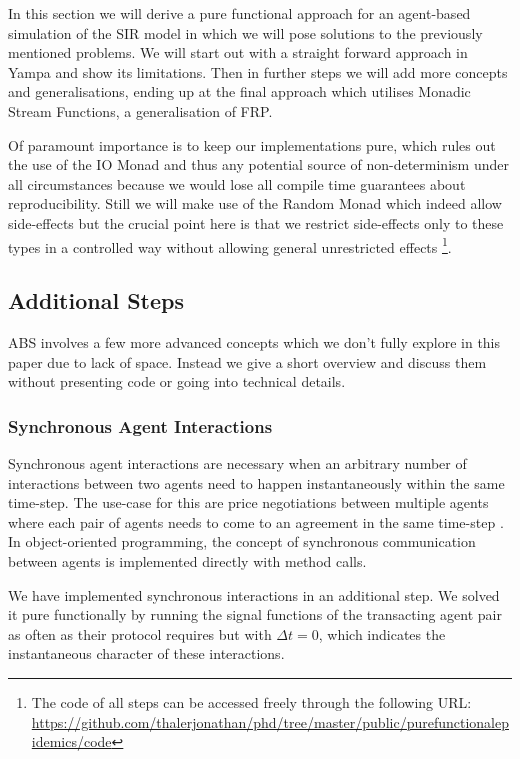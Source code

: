 In this section we will derive a pure functional approach for an agent-based simulation of the SIR model in which we will pose solutions to the previously mentioned problems. We will start out with a straight forward approach in Yampa and show its limitations. Then in further steps we will add more concepts and generalisations, ending up at the final approach which utilises Monadic Stream Functions, a generalisation of FRP.

Of paramount importance is to keep our implementations pure, which rules out the use of the IO Monad and thus any potential source of non-determinism under all circumstances because we would lose all compile time guarantees about reproducibility. Still we will make use of the Random Monad which indeed allow side-effects but the crucial point here is that we restrict side-effects only to these types in a controlled way without allowing general unrestricted effects
\footnote{The code of all steps can be accessed freely through the following URL: \url{https://github.com/thalerjonathan/phd/tree/master/public/purefunctionalepidemics/code}}.







\subsection{Additional Steps}
ABS involves a few more advanced concepts which we don't fully explore in this paper due to lack of space. Instead we give a short overview and discuss them without presenting code or going into technical details.

\subsubsection{Synchronous Agent Interactions}
Synchronous agent interactions are necessary when an arbitrary number of interactions between two agents need to happen instantaneously within the same time-step. The use-case for this are price negotiations between multiple agents where each pair of agents needs to come to an agreement in the same time-step \cite{epstein_growing_1996}. In object-oriented programming, the concept of synchronous communication between agents is implemented directly with method calls.

We have implemented synchronous interactions in an additional step. We solved it pure functionally by running the signal functions of the transacting agent pair as often as their protocol requires but with $\Delta t=0$, which indicates the instantaneous character of these interactions.

